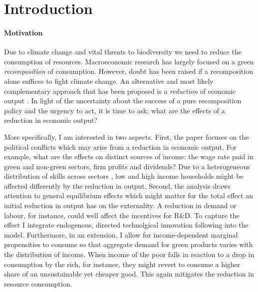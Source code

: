 \section{Introduction}

\paragraph{Motivation}%
Due to climate change and vital threats to biodiversity we need to reduce the consumption of resources. %
Macroeconomic research has largely focused on a green \textit{recomposition} of consumption. However, doubt has been raised if a recomposition alone suffices to fight climate change. An alternative and most likely complementary approach that has been proposed is a \textit{reduction} of economic output \citep[e.g.][]{Dasgupta2021, GoughCANGREEN, Naqvi2017FiftyPollutants}. %
In light of the uncertainty about the success of a pure recomposition policy and the urgency to act, it is time to ask: what are the effects of a reduction in economic output? 


More specifically, I am interested in two aspects. First, the paper focuses on the political conflicts which may arise from a reduction in economic output. 
For example, what are the effects on distinct sources of income: the wage rate paid in green and non-green sectors, firm profits and dividends?  Due to a heterogeneous distribution of skills across sectors \cite{Bowen2018CharacterisingComposition, Consoli2016DoCapital}, low and high income households might be affected differently by the reduction in output. 
Second, the analysis draws attention to general equilibrium effects which might matter for the total effect an initial reduction in output has on the externality. 
A reduction in demand or labour, for instance, could well affect the incentives for R\&D. To capture the effect I integrate  endogenous, directed technolgical innovation following  \cite{Acemoglu2012TheChange} into the model. Furthermore, in an extension, I allow for income-dependent marginal propensities to consume so that aggregate demand for green products varies with the distribution of income. When income of the poor falls in reaction to a drop in consumption by the rich, for instance, they might revert to consume a higher share of an unsustainable yet cheaper good. This again mitigates the reduction in resource consumption. 


